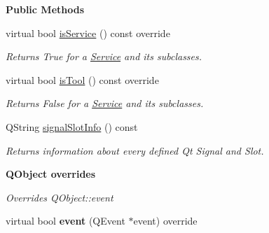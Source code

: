 \begin{Indent}\textbf{ Public Methods}\par
\begin{DoxyCompactItemize}
\item 
\mbox{\label{classrev_1_1_service_a25083080ff89864392afde80950f089e}} 
virtual bool \mbox{\hyperlink{classrev_1_1_service_a25083080ff89864392afde80950f089e}{is\+Service}} () const override
\begin{DoxyCompactList}\small\item\em Returns True for a \mbox{\hyperlink{classrev_1_1_service}{Service}} and its subclasses. \end{DoxyCompactList}\item 
\mbox{\label{classrev_1_1_service_a940c9b3fbc4e2abbf3e4237e309a25a3}} 
virtual bool \mbox{\hyperlink{classrev_1_1_service_a940c9b3fbc4e2abbf3e4237e309a25a3}{is\+Tool}} () const override
\begin{DoxyCompactList}\small\item\em Returns False for a \mbox{\hyperlink{classrev_1_1_service}{Service}} and its subclasses. \end{DoxyCompactList}\item 
\mbox{\label{classrev_1_1_service_a8cd6c1c577180bf6b03adbc444ea5a45}} 
Q\+String \mbox{\hyperlink{classrev_1_1_service_a8cd6c1c577180bf6b03adbc444ea5a45}{signal\+Slot\+Info}} () const
\begin{DoxyCompactList}\small\item\em Returns information about every defined Qt Signal and Slot. \end{DoxyCompactList}\end{DoxyCompactItemize}
\end{Indent}
\begin{Indent}\textbf{ Q\+Object overrides}\par
{\em Overrides Q\+Object\+::event }\begin{DoxyCompactItemize}
\item 
\mbox{\label{classrev_1_1_service_a29b6deb954043cac75da2a038c4d4976}} 
virtual bool {\bfseries event} (Q\+Event $\ast$event) override
\end{DoxyCompactItemize}
\end{Indent}
